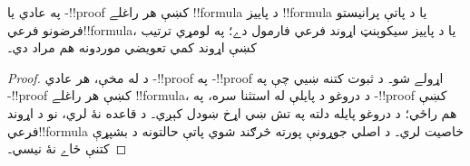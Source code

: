 \documentclass[../../../include/open-logic-section]{subfiles}
\begin{document}
\begin{cor}
په عادي  يا -!!{proof} کښې هر راغلے
!!{formula} د پاييز !!{formula} يا د پاتې پرانيستو فرضونو
فرعي‌!!{formula}، يا د پاييز سيکوېنټ اړوند فرعي فارمول دے؛
په لومړي ترتيب کښې اړوند کمي تعويضي موردونه هم مراد دي۔
\end{cor}

\begin{proof}
د  له مخې، هر عادي
-!!{proof} په -!!{proof} اړولے شو۔ د
ثبوت کتنه ښيي چې په -!!{proof} کښې هر راغلے
!!{formula}، د دروغو د پايلې له استثنا سره، په
-!!{proof} کښې هم راځي؛ د دروغو پايله دلته په
تش ښي اړخ ښودل کېږي۔  د \Cut{} قاعده نۀ لري،
نو د اړوند فرعي‌!!{formula} خاصيت لري۔ د اصلي جوړونې
پورته څرګند شوي پاتې حالتونه د بشپړې کتنې ځاے نۀ نيسي۔
\end{proof}
\end{document}
